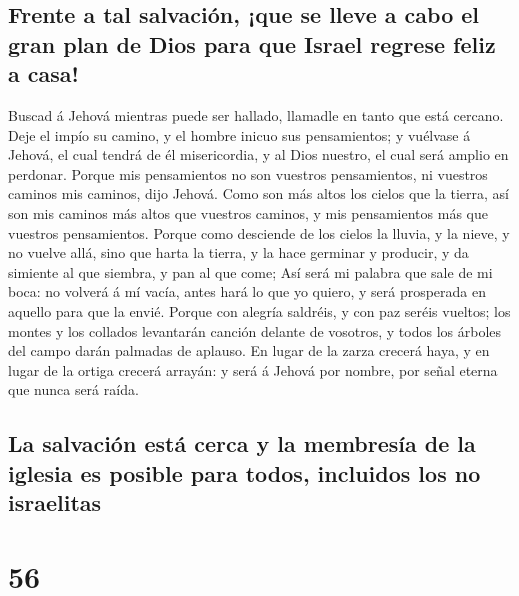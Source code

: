 \hypertarget{frente-a-tal-salvaciuxf3n-que-se-lleve-a-cabo-el-gran-plan-de-dios-para-que-israel-regrese-feliz-a-casa}{%
\subsection{Frente a tal salvación, ¡que se lleve a cabo el gran plan de
Dios para que Israel regrese feliz a
casa!}\label{frente-a-tal-salvaciuxf3n-que-se-lleve-a-cabo-el-gran-plan-de-dios-para-que-israel-regrese-feliz-a-casa}}

 Buscad á Jehová mientras puede ser hallado, llamadle en
tanto que está cercano.  Deje el impío su camino, y el
hombre inicuo sus pensamientos; y vuélvase á Jehová, el cual tendrá de
él misericordia, y al Dios nuestro, el cual será amplio en perdonar.
 Porque mis pensamientos no son vuestros pensamientos, ni
vuestros caminos mis caminos, dijo Jehová.  Como son más
altos los cielos que la tierra, así son mis caminos más altos que
vuestros caminos, y mis pensamientos más que vuestros pensamientos.
 Porque como desciende de los cielos la lluvia, y la
nieve, y no vuelve allá, sino que harta la tierra, y la hace germinar y
producir, y da simiente al que siembra, y pan al que come;
 Así será mi palabra que sale de mi boca: no volverá á mí
vacía, antes hará lo que yo quiero, y será prosperada en aquello para
que la envié.  Porque con alegría saldréis, y con paz
seréis vueltos; los montes y los collados levantarán canción delante de
vosotros, y todos los árboles del campo darán palmadas de aplauso.
 En lugar de la zarza crecerá haya, y en lugar de la
ortiga crecerá arrayán: y será á Jehová por nombre, por señal eterna que
nunca será raída.

\hypertarget{la-salvaciuxf3n-estuxe1-cerca-y-la-membresuxeda-de-la-iglesia-es-posible-para-todos-incluidos-los-no-israelitas}{%
\subsection{La salvación está cerca y la membresía de la iglesia es
posible para todos, incluidos los no
israelitas}\label{la-salvaciuxf3n-estuxe1-cerca-y-la-membresuxeda-de-la-iglesia-es-posible-para-todos-incluidos-los-no-israelitas}}

\hypertarget{section-55}{%
\section{56}\label{section-55}}

